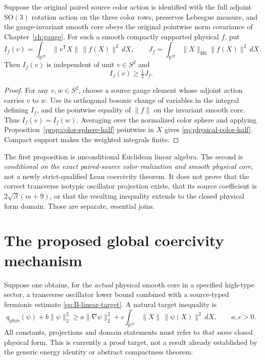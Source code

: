 \begin{proposition}\label{prop:physical-color-direction}
Suppose the original paired source color action is identified
with the full adjoint $\mathrm{SO}(3)$ rotation action on the
three color rows, preserves Lebesgue measure, and the
gauge-invariant smooth core obeys the original pointwise
norm covariance of Chapter~\ref{ch:gauge}. For such a smooth
compactly supported physical $f$, put
\[
 I_f(v)=\int_{\mathbb R^{27}}
       \|v^{\mathsf T}X\|\,\|f(X)\|^2\,dX,\qquad
 J_f=\int_{\mathbb R^{27}}\|X\|_{\mathrm{HS}}\|f(X)\|^2\,dX.
\]
Then $I_f(v)$ is independent of unit $v\in S^2$ and
\begin{equation}\label{eq:physical-color-half}
 I_f(v)\ge \tfrac12 J_f.
\end{equation}
\end{proposition}
\begin{proof}
For any $v,w\in S^2$, choose a source gauge element whose
adjoint action carries $v$ to $w$. Use its orthogonal
bosonic change of variables in the integral defining
$I_f$, and the pointwise equality of $\|f\|$ on the
invariant smooth core. Thus $I_f(v)=I_f(w)$.
Averaging over the normalized color sphere and applying
Proposition~\ref{prop:color-sphere-half} pointwise in $X$
gives \eqref{eq:physical-color-half}. Compact support
makes the weighted integrals finite.
\end{proof}
The first proposition is unconditional Euclidean
linear algebra. The second is \emph{conditional on the
exact paired-source color realization and smooth physical
core}, not a newly strict-qualified Lean coercivity theorem.
It does not prove that the correct transverse isotypic
oscillator projection exists, that its source coefficient is
$2\sqrt{\beta}(m+9)$, or that the resulting inequality
extends to the closed physical form domain. Those are
separate, essential joins.


\section{The proposed global coercivity mechanism}
Suppose one obtains, for the \emph{actual} physical smooth core in a
specified high-type sector, a transverse oscillator lower bound
combined with a source-typed fermionic estimate
\eqref{eq:B-linear-target}. A natural target inequality is
\begin{equation}\label{eq:sector-coercivity-target}
 q_{\mathrm{phys}}(\psi)+b\|\psi\|_2^2
 \ge a\|\nabla\psi\|_2^2+
 c\int_{\mathbb R^{27}}\!\|X\|\,\|\psi(X)\|^2\,dX,
 \qquad a,c>0.
\end{equation}
All constants, projections and domain statements must refer to
\emph{that same} closed physical form. This is currently a proof
target, not a result already established by the generic energy
identity or abstract compactness theorem.

